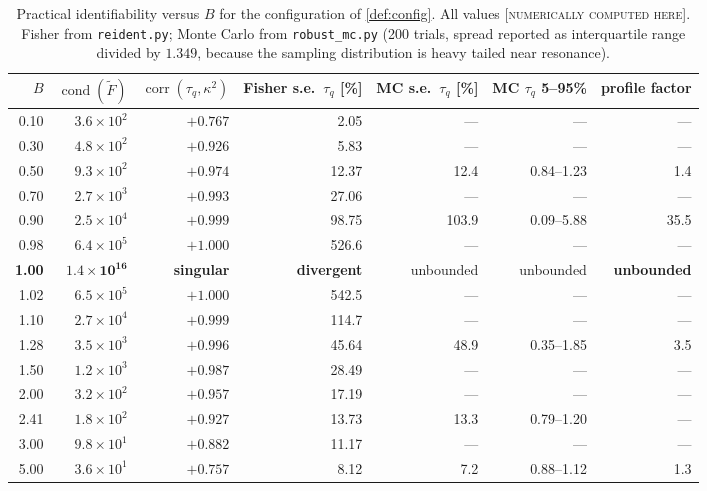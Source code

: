 \documentclass[11pt,a4paper]{article}
\theoremstyle{definition}
\newcommand{\NUM}{\textcolor{red!55!black}{\footnotesize[\textsc{numerically computed here}]}}
\newcommand{\tq}{\tau_{q}}
\newcommand{\kk}{\kappa^{2}}
\newcommand{\Bnum}{B}
\begin{document}
\begin{table}[H]
\centering
\caption{Practical identifiability versus $\Bnum$ for the configuration of
         \cref{def:config}. All values \NUM. Fisher from
         \texttt{reident.py}; Monte Carlo from \texttt{robust\_mc.py}
         (200 trials, spread reported as interquartile range divided by
         $1.349$, because the sampling distribution is heavy tailed near
         resonance).}
\label{tab:landscape}
\small
\begin{tabular}{@{}rrrrrrr@{}}
\toprule
$\Bnum$ & $\operatorname{cond}(\tilde F)$ &
$\operatorname{corr}(\tq,\kk)$ &
Fisher s.e.\ $\tq$ [\%] & MC s.e.\ $\tq$ [\%] &
MC $\tq$ 5--95\% & profile factor \\
\midrule
0.10 & $3.6\times10^{2}$ & $+0.767$ & 2.05  & ---   & ---          & --- \\
0.30 & $4.8\times10^{2}$ & $+0.926$ & 5.83  & ---   & ---          & --- \\
0.50 & $9.3\times10^{2}$ & $+0.974$ & 12.37 & 12.4  & 0.84--1.23   & 1.4 \\
0.70 & $2.7\times10^{3}$ & $+0.993$ & 27.06 & ---   & ---          & --- \\
0.90 & $2.5\times10^{4}$ & $+0.999$ & 98.75 & 103.9 & 0.09--5.88   & 35.5 \\
0.98 & $6.4\times10^{5}$ & $+1.000$ & 526.6 & ---   & ---          & --- \\
\textbf{1.00} & $\mathbf{1.4\times10^{16}}$ & \textbf{singular} &
  \textbf{divergent} & unbounded & unbounded & \textbf{unbounded} \\
1.02 & $6.5\times10^{5}$ & $+1.000$ & 542.5 & ---   & ---          & --- \\
1.10 & $2.7\times10^{4}$ & $+0.999$ & 114.7 & ---   & ---          & --- \\
1.28 & $3.5\times10^{3}$ & $+0.996$ & 45.64 & 48.9  & 0.35--1.85   & 3.5 \\
1.50 & $1.2\times10^{3}$ & $+0.987$ & 28.49 & ---   & ---          & --- \\
2.00 & $3.2\times10^{2}$ & $+0.957$ & 17.19 & ---   & ---          & --- \\
2.41 & $1.8\times10^{2}$ & $+0.927$ & 13.73 & 13.3  & 0.79--1.20   & --- \\
3.00 & $9.8\times10^{1}$ & $+0.882$ & 11.17 & ---   & ---          & --- \\
5.00 & $3.6\times10^{1}$ & $+0.757$ & 8.12  & 7.2   & 0.88--1.12   & 1.3 \\
\bottomrule
\end{tabular}
\end{table}
\end{document}
